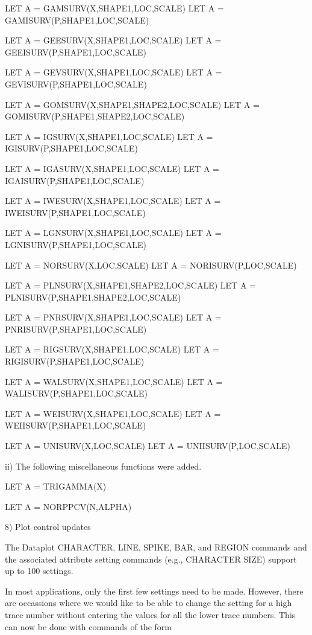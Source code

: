           LET A = GAMSURV(X,SHAPE1,LOC,SCALE)
          LET A = GAMISURV(P,SHAPE1,LOC,SCALE)

          LET A = GEESURV(X,SHAPE1,LOC,SCALE)
          LET A = GEEISURV(P,SHAPE1,LOC,SCALE)

          LET A = GEVSURV(X,SHAPE1,LOC,SCALE)
          LET A = GEVISURV(P,SHAPE1,LOC,SCALE)

          LET A = GOMSURV(X,SHAPE1,SHAPE2,LOC,SCALE)
          LET A = GOMISURV(P,SHAPE1,SHAPE2,LOC,SCALE)

          LET A = IGSURV(X,SHAPE1,LOC,SCALE)
          LET A = IGISURV(P,SHAPE1,LOC,SCALE)

          LET A = IGASURV(X,SHAPE1,LOC,SCALE)
          LET A = IGAISURV(P,SHAPE1,LOC,SCALE)

          LET A = IWESURV(X,SHAPE1,LOC,SCALE)
          LET A = IWEISURV(P,SHAPE1,LOC,SCALE)

          LET A = LGNSURV(X,SHAPE1,LOC,SCALE)
          LET A = LGNISURV(P,SHAPE1,LOC,SCALE)

          LET A = NORSURV(X,LOC,SCALE)
          LET A = NORISURV(P,LOC,SCALE)

          LET A = PLNSURV(X,SHAPE1,SHAPE2,LOC,SCALE)
          LET A = PLNISURV(P,SHAPE1,SHAPE2,LOC,SCALE)

          LET A = PNRSURV(X,SHAPE1,LOC,SCALE)
          LET A = PNRISURV(P,SHAPE1,LOC,SCALE)

          LET A = RIGSURV(X,SHAPE1,LOC,SCALE)
          LET A = RIGISURV(P,SHAPE1,LOC,SCALE)

          LET A = WALSURV(X,SHAPE1,LOC,SCALE)
          LET A = WALISURV(P,SHAPE1,LOC,SCALE)

          LET A = WEISURV(X,SHAPE1,LOC,SCALE)
          LET A = WEIISURV(P,SHAPE1,LOC,SCALE)

          LET A = UNISURV(X,LOC,SCALE)
          LET A = UNIISURV(P,LOC,SCALE)

     ii) The following miscellaneous functions were added.

          LET A = TRIGAMMA(X)

          LET A = NORPPCV(N,ALPHA)

 8) Plot control updates

    The Dataplot CHARACTER, LINE, SPIKE, BAR, and REGION commands
    and the associated attribute setting commands (e.g., CHARACTER
    SIZE) support up to 100 settings.

    In most applications, only the first few settings need to be made.
    However, there are occassions where we would like to be able
    to change the setting for a high trace number without entering
    the values for all the lower trace numbers.  This can now be
    done with commands of the form

